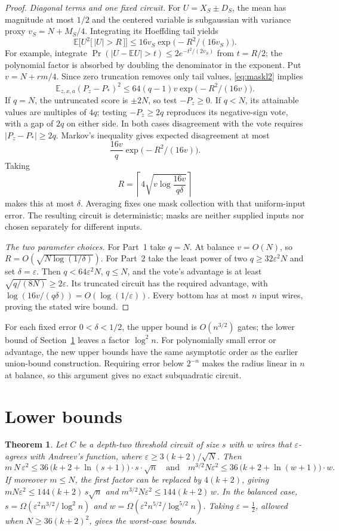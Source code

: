 \documentclass[11pt,letterpaper]{article}
\newtheorem{theorem}{Theorem}
\theoremstyle{remark}
\newcommand{\ind}[1]{\bigl[\,#1\,\bigr]}
\newcommand{\sect}[1]{\section{\texorpdfstring{\color{ink}#1}{#1}}}
\begin{document}
\begin{proof}
\emph{Diagonal terms and one fixed circuit.}
For $U=X_S\pm D_S$, the mean has magnitude at most $1/2$ and the centered
variable is subgaussian with variance proxy $v_S=N+M_S/4$. Integrating its
Hoeffding tail yields
\[
\mathbb E\bigl[U^2\ind{|U|>R}\bigr]
 \le16v_S\exp\bigl(-R^2/(16v_S)\bigr).
\]
For example, integrate
$\Pr(|U-\mathbb EU|>t)\le2e^{-t^2/(2v_S)}$ from $t=R/2$;
the polynomial factor is absorbed by doubling the denominator in the
exponent. Put $v=N+rm/4$. Since zero truncation removes only tail values,
\eqref{eq:maskl2} implies
\[
\mathbb E_{z,x,a}(P_z-P_*)^2
 \le64(q-1)v\exp\bigl(-R^2/(16v)\bigr).
\]
If $q=N$, the untruncated score is $\pm2N$, so test $-P_z\ge0$.
If $q<N$, its attainable values are multiples of $4q$; testing
$-P_z\ge2q$ reproduces its negative-sign vote, with a gap of $2q$ on
either side. In both cases disagreement with the vote requires
$|P_z-P_*|\ge2q$. Markov's inequality gives expected disagreement at most
\[
\frac{16v}{q}\exp\bigl(-R^2/(16v)\bigr).
\]
Taking
\[
R=\left\lceil4\sqrt{v\log\frac{16v}{q\delta}}\right\rceil
\]
makes this at most $\delta$. Averaging fixes one mask collection with that
uniform-input error. The resulting circuit is deterministic; masks are
neither supplied inputs nor chosen separately for different inputs.

\emph{The two parameter choices.}
For Part~1 take $q=N$. At balance $v=O(N)$, so
$R=O(\sqrt{N\log(1/\delta)})$. For Part~2 take the least power of two
$q\ge32\varepsilon^2N$ and set $\delta=\varepsilon$.
Then $q<64\varepsilon^2N$, $q\le N$, and the vote's advantage is at least
$\sqrt{q/(8N)}\ge2\varepsilon$. Its truncated circuit has the required
advantage, with $\log(16v/(q\delta))=O(\log(1/\varepsilon))$.
Every bottom has at most $n$ input wires, proving the stated wire bound.
\end{proof}

For each fixed error $0<\delta<1/2$, the upper bound is $O(n^{3/2})$ gates;
the lower bound
of Section~\ref{sec:lower} leaves a factor $\log^2n$. For polynomially small
error or advantage, the new upper bounds have the same asymptotic order as
the earlier union-bound construction. Requiring error below $2^{-n}$ makes
the radius linear in $n$ at balance, so this argument gives no exact
subquadratic circuit.


\sect{Lower bounds}\label{sec:lower}

\begin{theorem}\label{thm:lower}
Let $C$ be a depth-two threshold circuit of size $s$ with $w$ wires that
$\varepsilon$-agrees with Andreev's function, where
$\varepsilon\ge3(k+2)/\sqrt N$. Then
\[
m\,N\,\varepsilon^2\le 36\,\bigl(k+2+\ln(s+1)\bigr)\cdot s\cdot\sqrt n
\quad\text{and}\quad
m^{3/2}N\varepsilon^2\le 36\,\bigl(k+2+\ln(w+1)\bigr)\cdot w .
\]
If moreover $m\le N$, the first factor can be replaced by $4(k+2)$, giving
$mN\varepsilon^2\le144(k+2)\,s\sqrt n$ and
$m^{3/2}N\varepsilon^2\le144(k+2)\,w$. In the balanced case,
$s=\Omega(\varepsilon^2n^{3/2}/\log^2n)$ and
$w=\Omega(\varepsilon^2n^{5/2}/\log^{5/2}n)$. Taking $\varepsilon=\tfrac12$,
allowed when $N\ge36(k+2)^2$, gives the worst-case bounds.
\end{theorem}
\end{document}
